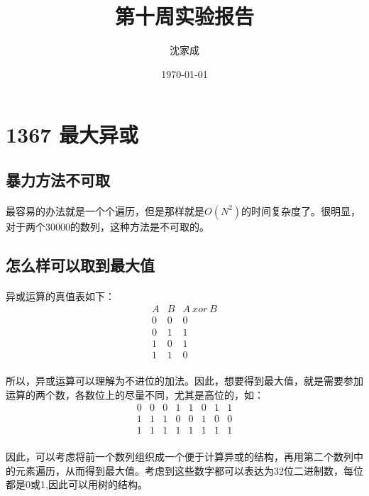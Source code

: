 \documentclass[UTF-8, 12pt]{ctexart}
\title{第十周实验报告}
\author{沈家成}
\date{\today}
\begin{document}
\maketitle
\section{1367 最大异或}
    \subsection{暴力方法不可取}
    \paragraph{}
    最容易的办法就是一个个遍历，但是那样就是$O(N^2)$的时间复杂度了。很明显，对于两个30000的数列，这种方法是不可取的。

    \subsection{怎么样可以取到最大值}
    \paragraph{}
    异或运算的真值表如下：
    \begin{equation}
        \begin{array}{ccc}
            A & B & A\ xor\ B \\
            0 & 0 & 0 \\
            0 & 1 & 1 \\
            1 & 0 & 1 \\
            1 & 1 & 0
        \end{array}
    \end{equation}
    \paragraph{}
    所以，异或运算可以理解为不进位的加法。因此，想要得到最大值，就是需要参加运算的两个数，各数位上的尽量不同，尤其是高位的，如：
    \begin{equation}
        \begin{array}{cccccccc}
            0 & 0 & 0 & 1 & 1 & 0 & 1 & 1 \\
            1 & 1 & 1 & 0 & 0 & 1 & 0 & 0 \\
            1 & 1 & 1 & 1 & 1 & 1 & 1 & 1
        \end{array}
    \end{equation}
    \paragraph{}
    因此，可以考虑将前一个数列组织成一个便于计算异或的结构，再用第二个数列中的元素遍历，从而得到最大值。考虑到这些数字都可以表达为32位二进制数，每位都是0或1,因此可以用树的结构。
\end{document}
